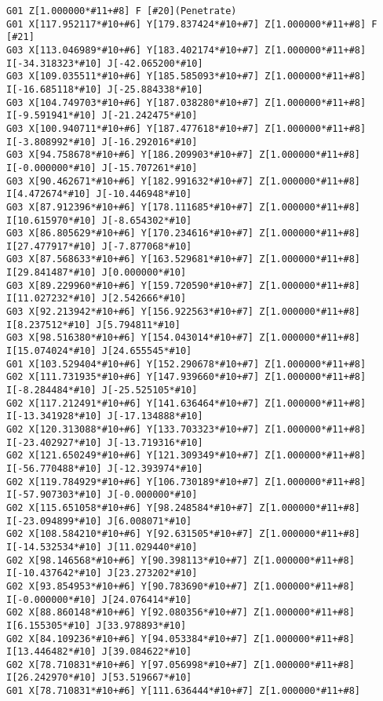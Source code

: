\begin{lstlisting}[caption={App4-Display full listing for 2D KSG G-Code}, label=App4-Display full listing for 2D KSG G-Code]
G01 Z[1.000000*#11+#8] F [#20](Penetrate)
G01 X[117.952117*#10+#6] Y[179.837424*#10+#7] Z[1.000000*#11+#8] F [#21]
G03 X[113.046989*#10+#6] Y[183.402174*#10+#7] Z[1.000000*#11+#8] I[-34.318323*#10] J[-42.065200*#10]
G03 X[109.035511*#10+#6] Y[185.585093*#10+#7] Z[1.000000*#11+#8] I[-16.685118*#10] J[-25.884338*#10]
G03 X[104.749703*#10+#6] Y[187.038280*#10+#7] Z[1.000000*#11+#8] I[-9.591941*#10] J[-21.242475*#10]
G03 X[100.940711*#10+#6] Y[187.477618*#10+#7] Z[1.000000*#11+#8] I[-3.808992*#10] J[-16.292016*#10]
G03 X[94.758678*#10+#6] Y[186.209903*#10+#7] Z[1.000000*#11+#8] I[-0.000000*#10] J[-15.707261*#10]
G03 X[90.462671*#10+#6] Y[182.991632*#10+#7] Z[1.000000*#11+#8] I[4.472674*#10] J[-10.446948*#10]
G03 X[87.912396*#10+#6] Y[178.111685*#10+#7] Z[1.000000*#11+#8] I[10.615970*#10] J[-8.654302*#10]
G03 X[86.805629*#10+#6] Y[170.234616*#10+#7] Z[1.000000*#11+#8] I[27.477917*#10] J[-7.877068*#10]
G03 X[87.568633*#10+#6] Y[163.529681*#10+#7] Z[1.000000*#11+#8] I[29.841487*#10] J[0.000000*#10]
G03 X[89.229960*#10+#6] Y[159.720590*#10+#7] Z[1.000000*#11+#8] I[11.027232*#10] J[2.542666*#10]
G03 X[92.213942*#10+#6] Y[156.922563*#10+#7] Z[1.000000*#11+#8] I[8.237512*#10] J[5.794811*#10]
G03 X[98.516380*#10+#6] Y[154.043014*#10+#7] Z[1.000000*#11+#8] I[15.074024*#10] J[24.655545*#10]
G01 X[103.529404*#10+#6] Y[152.290678*#10+#7] Z[1.000000*#11+#8]
G02 X[111.731935*#10+#6] Y[147.939660*#10+#7] Z[1.000000*#11+#8] I[-8.284484*#10] J[-25.525105*#10]
G02 X[117.212491*#10+#6] Y[141.636464*#10+#7] Z[1.000000*#11+#8] I[-13.341928*#10] J[-17.134888*#10]
G02 X[120.313088*#10+#6] Y[133.703323*#10+#7] Z[1.000000*#11+#8] I[-23.402927*#10] J[-13.719316*#10]
G02 X[121.650249*#10+#6] Y[121.309349*#10+#7] Z[1.000000*#11+#8] I[-56.770488*#10] J[-12.393974*#10]
G02 X[119.784929*#10+#6] Y[106.730189*#10+#7] Z[1.000000*#11+#8] I[-57.907303*#10] J[-0.000000*#10]
G02 X[115.651058*#10+#6] Y[98.248584*#10+#7] Z[1.000000*#11+#8] I[-23.094899*#10] J[6.008071*#10]
G02 X[108.584210*#10+#6] Y[92.631505*#10+#7] Z[1.000000*#11+#8] I[-14.532534*#10] J[11.029440*#10]
G02 X[98.146568*#10+#6] Y[90.398113*#10+#7] Z[1.000000*#11+#8] I[-10.437642*#10] J[23.273202*#10]
G02 X[93.854953*#10+#6] Y[90.783690*#10+#7] Z[1.000000*#11+#8] I[-0.000000*#10] J[24.076414*#10]
G02 X[88.860148*#10+#6] Y[92.080356*#10+#7] Z[1.000000*#11+#8] I[6.155305*#10] J[33.978893*#10]
G02 X[84.109236*#10+#6] Y[94.053384*#10+#7] Z[1.000000*#11+#8] I[13.446482*#10] J[39.084622*#10]
G02 X[78.710831*#10+#6] Y[97.056998*#10+#7] Z[1.000000*#11+#8] I[26.242970*#10] J[53.519667*#10]
G01 X[78.710831*#10+#6] Y[111.636444*#10+#7] Z[1.000000*#11+#8]

\end{lstlisting}
